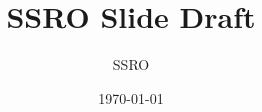 \documentclass{beamer}
\title{SSRO Slide Draft}
\author{SSRO}
\date{\today}
\begin{document}
\frame{\titlepage}






\end{document}
